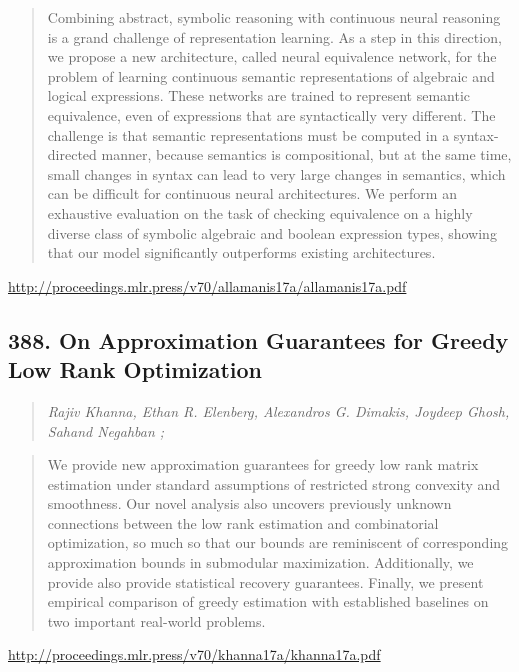 \documentclass{article}
\begin{document}
\begin{quote}
    Combining abstract, symbolic reasoning with continuous neural reasoning is a grand challenge of representation learning. As a step in this direction, we propose a new architecture, called neural equivalence network, for the problem of learning continuous semantic representations of algebraic and logical expressions. These networks are trained to represent semantic equivalence, even of expressions that are syntactically very different. The challenge is that semantic representations must be computed in a syntax-directed manner, because semantics is compositional, but at the same time, small changes in syntax can lead to very large changes in semantics, which can be difficult for continuous neural architectures. We perform an exhaustive evaluation on the task of checking equivalence on a highly diverse class of symbolic algebraic and boolean expression types, showing that our model significantly outperforms existing architectures.  \end{quote}

\href{http://proceedings.mlr.press/v70/allamanis17a/allamanis17a.pdf}{http://proceedings.mlr.press/v70/allamanis17a/allamanis17a.pdf}

\subsection{388. On Approximation Guarantees for Greedy Low Rank Optimization}

\begin{quote}
\footnotesize{\textit{Rajiv Khanna, Ethan R. Elenberg, Alexandros G. Dimakis, Joydeep Ghosh, Sahand Negahban ;}}
\end{quote}

\begin{quote}
    We provide new approximation guarantees for greedy low rank matrix estimation under standard assumptions of restricted strong convexity and smoothness. Our novel analysis also uncovers previously unknown connections between the low rank estimation and combinatorial optimization, so much so that our bounds are reminiscent of corresponding approximation bounds in submodular maximization. Additionally, we provide also provide statistical recovery guarantees. Finally, we present empirical comparison of greedy estimation with established baselines on two important real-world problems.  \end{quote}

\href{http://proceedings.mlr.press/v70/khanna17a/khanna17a.pdf}{http://proceedings.mlr.press/v70/khanna17a/khanna17a.pdf}
\end{document}
